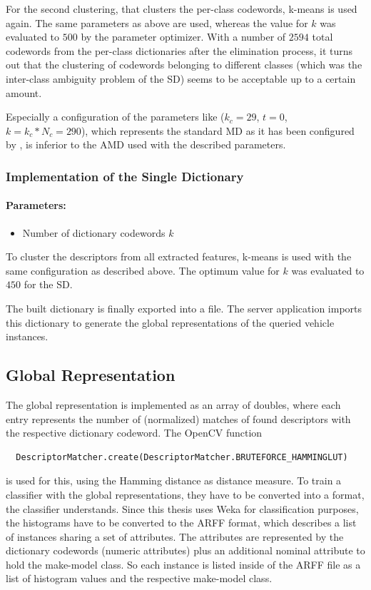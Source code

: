 For the second clustering, that clusters the per-class codewords, k-means is used again. The same parameters as above are used, whereas the value for $k$ was evaluated to $500$ by the parameter optimizer. With a number of $2594$ total codewords from the per-class dictionaries after the elimination process, it turns out that the clustering of codewords belonging to different classes (which was the inter-class ambiguity problem of the SD) seems to be acceptable up to a certain amount.

Especially a configuration of the parameters like ($k_c = 29$, $t = 0$, $k = k_c * N_c = 290$), which represents the standard MD as it has been configured by \citep{siddiqui2015robust}, is inferior to the AMD used with the described parameters.

\subsubsection{Implementation of the Single Dictionary}
\paragraph{Parameters:}
\begin{itemize}
  \item Number of dictionary codewords $k$
\end{itemize}
To cluster the descriptors from all extracted features, k-means is used with the same configuration as described above. The optimum value for $k$ was evaluated to $450$ for the SD.

The built dictionary is finally exported into a file. The server application imports this dictionary to generate the global representations of the queried vehicle instances.

\subsection{Global Representation}\label{sec:globalRepresentationImpl}
The global representation is implemented as an array of doubles, where each entry represents the number of (normalized) matches of found descriptors with the respective dictionary codeword. The OpenCV function
\begin{verbatim}
  DescriptorMatcher.create(DescriptorMatcher.BRUTEFORCE_HAMMINGLUT)
\end{verbatim}
is used for this, using the Hamming distance as distance measure. To train a classifier with the global representations, they have to be converted into a format, the classifier understands. Since this thesis uses Weka for classification purposes, the histograms have to be converted to the ARFF format, which describes a list of instances sharing a set of attributes. The attributes are represented by the dictionary codewords (numeric attributes) plus an additional nominal attribute to hold the make-model class. So each instance is listed inside of the ARFF file as a list of histogram values and the respective make-model class.

